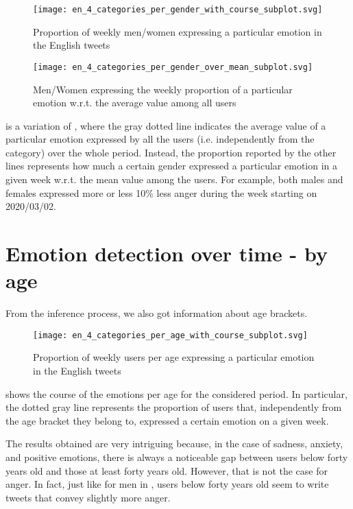 \begin{figure}[H]
	\centering
    	\texttt{[image: en\_4\_categories\_per\_gender\_with\_course\_subplot.svg]}
    	\caption{Proportion of weekly men/women expressing a particular emotion in the English tweets}
    	\label{fig:en-4-categories-per-gender-course-mean}
\end{figure}

\begin{figure}[H]
	\centering
    	\texttt{[image: en\_4\_categories\_per\_gender\_over\_mean\_subplot.svg]}
    	\caption{Men/Women expressing the weekly proportion of a particular emotion w.r.t. the average value among all users}
    	\label{fig:en-4-categories-per-gender-over-mean}
\end{figure}

 is a variation of , where the gray dotted line indicates the average value of a particular emotion expressed by all the users (i.e. independently from the category) over the whole period. Instead, the proportion reported by the other lines represents how much a certain gender expressed a particular emotion in a given week w.r.t. the mean value among the users. For example, both males and females expressed more or less 10\% less anger during the week starting on 2020/03/02.

\section{Emotion detection over time - by age}
\label{sec:emotion-by-age-results}

From the inference process, we also got information about age brackets.

\begin{figure}[H]
	\centering
    	\texttt{[image: en\_4\_categories\_per\_age\_with\_course\_subplot.svg]}
    	\caption{Proportion of weekly users per age expressing a particular emotion in the English tweets}
    	\label{fig:en-4-categories-per-age-course-mean}
\end{figure}

 shows the course of the emotions per age for the considered period. In particular, the dotted gray line represents the proportion of users that, independently from the age bracket they belong to, expressed a certain emotion on a given week. 

The results obtained are very intriguing because, in the case of sadness, anxiety, and positive emotions, there is always a noticeable gap between users below forty years old and those at least forty years old. However, that is not the case for anger. In fact, just like for men in , users below forty years old seem to write tweets that convey slightly more anger.

